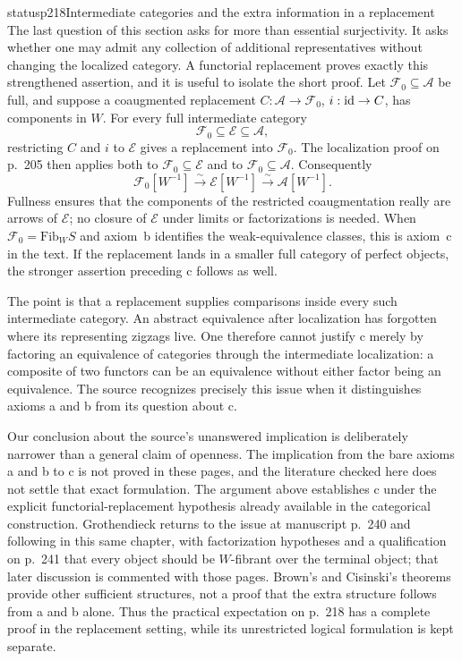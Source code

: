 \begin{dcomment}{status}{p218}{Intermediate categories and the extra information in a replacement}
The last question of this section asks for more than essential surjectivity. It asks whether one may admit any collection of additional representatives without changing the localized category. A functorial replacement proves exactly this strengthened assertion, and it is useful to isolate the short proof. Let $\mathcal F_0\subseteq\mathcal A$ be full, and suppose a coaugmented replacement $C:\mathcal A\to\mathcal F_0$, $i:\mathrm{id}\to C$, has components in $W$. For every full intermediate category
\[
 \mathcal F_0\subseteq\mathcal E\subseteq\mathcal A,
\]
restricting $C$ and $i$ to $\mathcal E$ gives a replacement into $\mathcal F_0$. The localization proof on p.~205 then applies both to $\mathcal F_0\subseteq\mathcal E$ and to $\mathcal F_0\subseteq\mathcal A$. Consequently
\[
 \mathcal F_0[W^{-1}]\xrightarrow{\sim}
 \mathcal E[W^{-1}]\xrightarrow{\sim}
 \mathcal A[W^{-1}].
\]
Fullness ensures that the components of the restricted coaugmentation really are arrows of $\mathcal E$; no closure of $\mathcal E$ under limits or factorizations is needed. When $\mathcal F_0=\mathrm{Fib}_W S$ and axiom~b identifies the weak-equivalence classes, this is axiom~c in the text. If the replacement lands in a smaller full category of perfect objects, the stronger assertion preceding c follows as well.

The point is that a replacement supplies comparisons inside every such intermediate category. An abstract equivalence after localization has forgotten where its representing zigzags live. One therefore cannot justify c merely by factoring an equivalence of categories through the intermediate localization: a composite of two functors can be an equivalence without either factor being an equivalence. The source recognizes precisely this issue when it distinguishes axioms a and b from its question about c.

Our conclusion about the source's unanswered implication is deliberately narrower than a general claim of openness. The implication from the bare axioms a and b to c is not proved in these pages, and the literature checked here does not settle that exact formulation. The argument above establishes c under the explicit functorial-replacement hypothesis already available in the categorical construction. Grothendieck returns to the issue at manuscript p.~240 and following in this same chapter, with factorization hypotheses and a qualification on p.~241 that every object should be $W$-fibrant over the terminal object; that later discussion is commented with those pages. Brown's and Cisinski's theorems provide other sufficient structures, not a proof that the extra structure follows from a and b alone. Thus the practical expectation on p.~218 has a complete proof in the replacement setting, while its unrestricted logical formulation is kept separate.
\end{dcomment}


